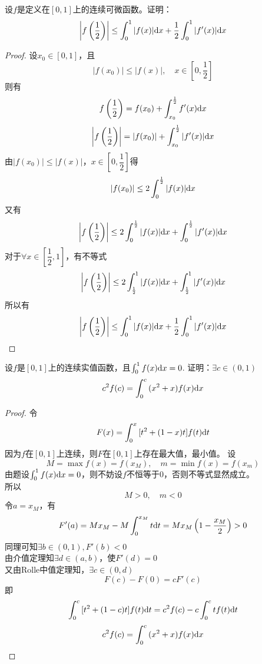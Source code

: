 \begin{proposition}
    
    设$f$是定义在$[0, 1]$上的连续可微函数。证明：
    \[\left| f\left( \dfrac{1}{2} \right) \right| \leq \int_{0}^{1}{|f(x)|}\mathrm{d} x + \dfrac{1}{2} \int_{0}^{1}{|f'(x)|}\mathrm{d} x\]

\end{proposition}

\begin{proof}

    设$x_0 \in [0, 1]$，且
    \[|f(x_0)| \leq |f(x)|, \quad x \in \left[ 0, \dfrac{1}{2} \right]\]
    则有
    \[f\left( \dfrac{1}{2} \right) = f(x_0) + \int_{x_0}^{\frac{1}{2}}{f'(x)}\mathrm{d} x\]
    \[\left| f\left( \dfrac{1}{2} \right) \right| = |f(x_0)| + \int_{x_0}^{\frac{1}{2}}{|f'(x)|}\mathrm{d} x\]
    由$|f(x_0)| \leq |f(x)|$，$x \in \left[ 0, \dfrac{1}{2} \right]$得
    \[|f(x_0)| \leq 2 \int_{0}^{\frac{1}{2}}{|f(x)|}\mathrm{d} x\]
    又有
    \[\left| f\left( \dfrac{1}{2} \right) \right| \leq 2\int_{0}^{\frac{1}{2}}{|f(x)|}\mathrm{d} x + \int_{0}^{\frac{1}{2}}{|f'(x)|}\mathrm{d} x\]
    对于$\forall x \in \left[ \dfrac{1}{2}, 1 \right]$，有不等式
    \[\left| f\left( \dfrac{1}{2} \right) \right| \leq 2\int_{\frac{1}{2}}^{1}{|f(x)|}\mathrm{d} x + \int_{\frac{1}{2}}^{1}{|f'(x)|}\mathrm{d} x\]
    所以有
    \[\left| f\left( \dfrac{1}{2} \right) \right| \leq \int_{0}^{1}{|f(x)|}\mathrm{d} x + \dfrac{1}{2} \int_{0}^{1}{|f'(x)|}\mathrm{d} x\]

\end{proof}

\begin{proposition}

    设$f$是$[0, 1]$上的连续实值函数，且$\int_{0}^{1}{f(x)}\mathrm{d} x = 0$. 证明：$\exists c \in (0, 1)$
    \[c^2f(c) = \int_{0}^{c}{(x^2 + x)f(x)}\mathrm{d} x\]

\end{proposition}

\begin{proof}
    
    令
    \[F(x) = \int_{0}^{x}{[t^2 + (1 - x)t]f(t)}\mathrm{d} t\]
    因为$f$在$[0, 1]$上连续，则$F$在$[0, 1]$上存在最大值，最小值。
    设
    \[M = \max{f(x)} = f(x_M), \quad m = \min{f(x)} = f(x_m)\]
    由题设$\int_{0}^{1}{f(x)}\mathrm{d} x = 0$，则不妨设$f$不恒等于$0$，否则不等式显然成立。\\
    所以
    \[M > 0, \quad m < 0\]
    令$a = x_M$，有
    \[F'(a) = Mx_M - M\int_{0}^{x_M}{t}\mathrm{d} t = Mx_M \left( 1 - \dfrac{x_M}{2} \right) > 0\]
    同理可知$\exists b \in (0, 1), F'(b) < 0$ \\
    由介值定理知$\exists d \in (a, b)$，使$F'(d) = 0$ \\
    又由\textup{Rolle}中值定理知，$\exists c \in (0, d)$
    \[F(c) - F(0) = cF'(c)\]
    即
    \[\int_{0}^{c}{[t^2 + (1 - c)t]f(t)}\mathrm{d} t =  c^2f(c) - c\int_{0}^{c}{tf(t)}\mathrm{d} t\]
    \[c^2f(c) = \int_{0}^{c}{(x^2 + x)f(x)}\mathrm{d} x\]

\end{proof}

